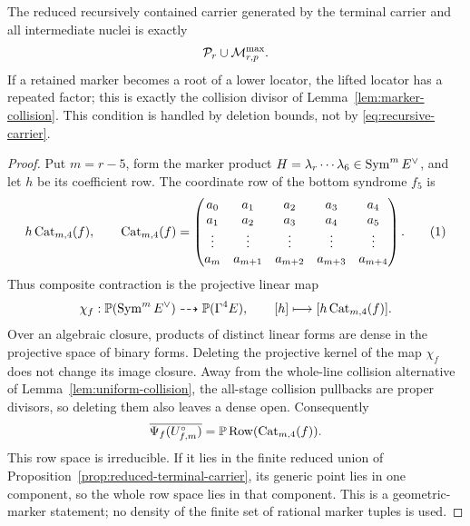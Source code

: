\begin{theorem}
\label{prop:recursive-component-selection}%
%
The reduced recursively contained carrier generated by the terminal carrier
and all intermediate nuclei is exactly
\begin{equation}\label{eq:recursive-carrier}
                       \mathcal P_r\cup\mathcal M^{\max}_{r,p}.
\end{equation}
If a retained marker becomes a
root of a lower locator, the lifted locator has a repeated factor; this is
exactly the collision divisor of
Lemma~\ref{lem:marker-collision}.  This condition is handled by deletion
bounds, not by \eqref{eq:recursive-carrier}.
\end{theorem}

\begin{proof}
Put \(m=r-5\), form the marker product
\(H=\lambda_r\cdots\lambda_6\in\operatorname{Sym}^mE^\vee\), and let \(h\) be its
coefficient row.  The coordinate row of the bottom syndrome \(f_5\) is
\[
 h\operatorname{Cat}_{m,4}(f),\qquad
 \operatorname{Cat}_{m,4}(f)=
 \begin{pmatrix}
 a_0&a_1&a_2&a_3&a_4\\
 a_1&a_2&a_3&a_4&a_5\\
 \vdots&\vdots&\vdots&\vdots&\vdots\\
 a_m&a_{m+1}&a_{m+2}&a_{m+3}&a_{m+4}
 \end{pmatrix}.
 \autoeqtag{eq:marker-catalecticant}
\]
Thus composite contraction is the projective linear map
\[
 \chi_f:\mathbb P(\operatorname{Sym}^mE^\vee)\dashrightarrow\mathbb P(\Gamma^4E),\qquad
 [h]\longmapsto[h\operatorname{Cat}_{m,4}(f)].
\]
Over an algebraic closure, products of distinct linear forms are dense in
the projective space of binary forms.  Deleting the projective kernel of the
map \(\chi_f\) does not change its image closure.  Away from the whole-line
collision alternative of Lemma~\ref{lem:uniform-collision}, the
all-stage collision pullbacks are proper divisors, so deleting them also
leaves a dense open.  Consequently
\[
 \overline{\Psi_f(U^\circ_{f,m})}
 =\mathbb P\operatorname{Row}(\operatorname{Cat}_{m,4}(f)).
\]
This row space is
irreducible.  If it lies in the finite reduced union of
Proposition~\ref{prop:reduced-terminal-carrier}, its generic point lies in
one component, so the whole row space lies in that component.  This is a
geometric-marker statement; no density of the finite set of rational marker
tuples is used.


\end{proof}

